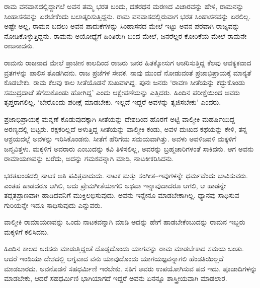 ರಾಮ ವನವಾಸದಲ್ಲಿದ್ದಾಗಲೆ ಅವನ ತಮ್ಮ ಭರತ ಬಂದು, ದಶರಥನ ಮರಣದ ವಿಚಾರವನ್ನು ಹೇಳಿ, ರಾಮನನ್ನು ಸಿಂಹಾಸನವನ್ನು ಏರಬೇಕೆಂದು ಬಲಾತ್ಕರಿಸುತ್ತಿದ್ದನು. ರಾಮ ವನವಾಸದಲ್ಲಿರುವಾಗ ಭರತ ಸಿಂಹಾಸನವನ್ನು ಏರಲಿಲ್ಲ. ಅಷ್ಟೇ ಅಲ್ಲ, ರಾಮನ ಬದಲು ಅವನ ಪಾದುಕೆಗಳನ್ನು ಸಿಂಹಾಸನದ ಮೇಲೆ ಇಟ್ಟು ಅವನ ಪರವಾಗಿ ರಾಜ್ಯವನ್ನು ನೋಡಿಕೊಳ್ಳುತ್ತಿದ್ದನು. ರಾಮನು ಅಯೋಧ್ಯೆಗೆ ಹಿಂತಿರುಗಿ ಬಂದ ಮೇಲೆ, ಜನರೆಲ್ಲರ ಕೋರಿಕೆಯ ಮೇಲೆ ರಾಮನೇ ರಾಜನಾದನು.

ರಾಮನು ರಾಜನಾದ ಮೇಲೆ ಪ್ರಾಚೀನ ಕಾಲದಿಂದ ರಾಜರು ಜನರ ಹಿತಕ್ಕೋಸುಗ ಆಚರಿಸುತ್ತಿದ್ದ ಕೆಲವು ಆವಕ್ಯಕವಾದ ವ್ರತಗಳನ್ನು ಪಾಲಿಸ ತೊಡಗಿದನು. ರಾಜ ಪ್ರಜೆಗಳ ಸೇವಕ. ನಾವು ಮುಂದೆ ನೋಡುವಂತೆ ಪ್ರಜಾಭಿಪ್ರಾಯಕ್ಕೆ ಮಾನ್ಯತೆ ಕೊಡಬೇಕು. ರಾಮ ಕೆಲವು ಕಾಲ ಸೀತೆಯೊಡನೆ ಸುಖವಾಗಿದ್ದ. ಪುನಃ ಜನರು ‘ರಾವಣ ಸೀತೆಯನ್ನು ಕದ್ದುಕೊಂಡು ಸಮುದ್ರದಾಚೆ ತೆಗೆದುಕೊಂಡು ಹೋಗಿದ್ದ’ ಎಂದು ಆಕ್ಷೇಪಣೆಯನ್ನು ಎತ್ತಿದರು. ಹಿಂದಿನ ಪರೀಕ್ಷೆಯಿಂದ ಅವರು ತೃಪ್ತರಾಗಲಿಲ್ಲ. ‘ಬೇರೊಂದು ಪರೀಕ್ಷೆ ಮಾಡಬೇಕು. ಇಲ್ಲದೆ ಇದ್ದರೆ ಅವಳನ್ನು ತ್ಯಜಿಸಬೇಕು’ ಎಂದರು.

ಪ್ರಜಾಭಿಪ್ರಾಯಕ್ಕೆ ಮನ್ನಣೆ ಕೊಡುವುದಕ್ಕಾಗಿ ಸೀತೆಯನ್ನು ದೇಶದಿಂದ ಹೊರಗೆ ಅಟ್ಟಿ ವಾಲ್ಮೀಕಿ ಮಹರ್ಷಿಯಿದ್ದ ಅರಣ್ಯದಲ್ಲಿ ಬಿಟ್ಟರು. ರಕ್ಷಕರಿಲ್ಲದೆ ಅಳುತ್ತಿದ್ದ ಸೀತೆಯನ್ನು ವಾಲ್ಮೀಕಿ ಕಂಡು, ಅವಳ ದುಃಖದ ಕಥೆಯನ್ನು ಕೇಳಿ, ತನ್ನ ಆಶ್ರಯದಲ್ಲೆ ಅವಳನ್ನು ಇರಿಸಿಕೊಂಡನು. ಸೀತೆಗೆ ಹೆರಿಗೆಯ ಸಮಯವಾಗಿತ್ತು. ಅವಳು ಅವಳಿಜವಳಿ ಮಕ್ಕಳಿಗೆ ಜನ್ಮವಿತ್ತಳು. ಮಕ್ಕಳಿಗೆ ಅವರಾರು ಎಂಬುದನ್ನು ಕವಿ ತಿಳಿಸಲಿಲ್ಲ, ಅವರನ್ನು ಬ್ರಹ್ಮಚಾರಿಗಳಂತೆ ಸಾಕಿದನು. ಆಗ ಅವನು ರಾಮಾಯಣವನ್ನು ಬರೆದು, ಅದನ್ನು ಗಮಕವನ್ನಾಗಿ ಮಾಡಿ, ನಾಟಕೀಕರಿಸಿದನು.

ಭರತಖಂಡದಲ್ಲಿ ನಾಟಕ ಅತಿ ಪವಿತ್ರವಾದುದು. ನಾಟಕ ಮತ್ತು ಸಂಗೀತ–ಇವುಗಳನ್ನೇ ಧರ್ಮವೆಂದು ಭಾವಿಸುವರು. ಎಂತಹ ಹಾಡದರೂ ಆಗಿಲಿ, ಅದು ಪ್ರೇಮಗೀತೆಯಾಗಲಿ ಅಥವಾ ಇನ್ನಾವುದಾದರೂ ಆಗಲಿ, ಆ ಹಾಡನ್ನೇ ತದ್ಗತಪ್ರಾಣವಾಗಿ ಹಾಡಿದವನಿಗೆ ಮುಕ್ತಿಲಭಿಸುವುದು. ಅವನು ಇನ್ನೇನೂ ಮಾಡಬೇಕಾಗಿಲ್ಲ. ಧ್ಯಾನವು ಸಾಧಿಸುವ ಗುರಿಯನ್ನೇ ಇದೂ ಸಾಧಿಸುವುದು ಎನ್ನುವರು.

ವಾಲ್ಮೀಕಿ ರಾಮಾಯಣವನ್ನು ಒಂದು ನಾಟಕವನ್ನಾಗಿ ಮಾಡಿ ಅದನ್ನು ಹೇಗೆ ಹಾಡಬೇಕೆಂಬುದನ್ನು ರಾಮನ ಇಬ್ಬರು ಮಕ್ಕಳಿಗೆ ಕಲಿಸಿದನು.

ಹಿಂದಿನ ಕಾಲದ ಅರಸರು ಮಾಡುತ್ತಿದ್ದಂತೆ ದೊಡ್ಡದೊಂದು ಯಾಗವನ್ನು ರಾಮ ಮಾಡಬೇಕಾದ ಸಮಯ ಬಂತು. ಆದರೆ ಇಂಡಿಯಾ ದೇಶದಲ್ಲಿ ಲಗ್ನವಾದ ವನು ಯಾವುದೊಂದು ಯಾಗಯಜ್ಞವನ್ನಾಗಲಿ ಹೆಂಡತಿಯಿಲ್ಲದೆ ಮಾಡಬಾರದು. ಅವನೊಡನೆ ಸಹಧರ್ಮಿಣಿ ಇರಬೇಕು. ಸತಿಗೆ ಅವರು ಉಪಯೋಗಿಸುವ ಪದ ಇದು. ಪೂಜಾದಿಗಳನ್ನು ಮಾಡಬೇಕು, ಆದರೆ ಸಹಧರ್ಮಿಣಿ ಭಾಗಿಯಾಗದೆ ಇದ್ದರೆ ಅವನು ಏನನ್ನೂ ಶಾಸ್ತ್ರೀಯವಾಗಿ ಮಾಡಲಾರ.

